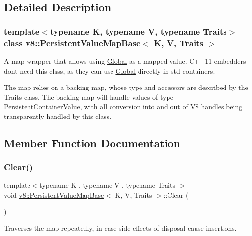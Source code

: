 \subsection{Detailed Description}
\subsubsection*{template$<$typename K, typename V, typename Traits$>$\newline
class v8\+::\+Persistent\+Value\+Map\+Base$<$ K, V, Traits $>$}

A map wrapper that allows using \mbox{\hyperlink{classv8_1_1Global}{Global}} as a mapped value. C++11 embedders don\textquotesingle{}t need this class, as they can use \mbox{\hyperlink{classv8_1_1Global}{Global}} directly in std containers.

The map relies on a backing map, whose type and accessors are described by the Traits class. The backing map will handle values of type Persistent\+Container\+Value, with all conversion into and out of V8 handles being transparently handled by this class. 

\subsection{Member Function Documentation}
\mbox{\label{classv8_1_1PersistentValueMapBase_a1bf074e7a7c24713c9a3d40ddce89e74}} 
\subsubsection{\texorpdfstring{Clear()}{Clear()}}
{\footnotesize\ttfamily template$<$typename K , typename V , typename Traits $>$ \\
void \mbox{\hyperlink{classv8_1_1PersistentValueMapBase}{v8\+::\+Persistent\+Value\+Map\+Base}}$<$ K, V, Traits $>$\+::Clear (\begin{DoxyParamCaption}{ }\end{DoxyParamCaption})\hspace{0.3cm}{\ttfamily [inline]}}

Traverses the map repeatedly, in case side effects of disposal cause insertions. \mbox{\label{classv8_1_1PersistentValueMapBase_a8c68e5f99c4042541c6d32232c97282a}} 
